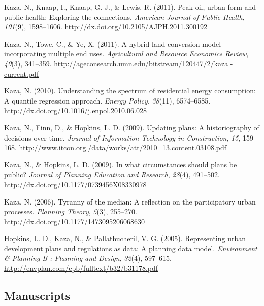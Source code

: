 \documentclass[11pt,a4paper,]{awesome-cv}
\newlength{\cslhangindent}
\newenvironment{CSLReferences}[2] %
 {\begin{list}{}{%
  \setlength{\itemindent}{0pt}
  \setlength{\leftmargin}{0pt}
  \setlength{\parsep}{0pt}
  \ifodd #1
   \setlength{\leftmargin}{\cslhangindent}
   \setlength{\itemindent}{-1\cslhangindent}
  \fi
  \setlength{\itemsep}{#2\baselineskip}}}
 {\end{list}}
\begin{document}
\begin{CSLReferences}{1}{0}
Kaza, N., Knaap, I., Knaap, G. J., \& Lewis, R. (2011). Peak oil, urban
form and public health: Exploring the connections. \emph{American
Journal of Public Health}, \emph{101}(9), 1598--1606.
\url{http://dx.doi.org/10.2105/AJPH.2011.300192}

Kaza, N., Towe, C., \& Ye, X. (2011). A hybrid land conversion model
incorporating multiple end uses. \emph{Agricultural and Resource
Economics Review}, \emph{40}(3), 341--359.
\href{http://ageconsearch.umn.edu/bitstream/120447/2/kaza\%20-\%20current.pdf}{http://ageconsearch.umn.edu/bitstream/120447/2/kaza
- current.pdf}

Kaza, N. (2010). Understanding the spectrum of residential energy
consumption: A quantile regression approach. \emph{Energy Policy},
\emph{38}(11), 6574--6585.
\url{http://dx.doi.org/10.1016/j.enpol.2010.06.028}

Kaza, N., Finn, D., \& Hopkins, L. D. (2009). Updating plans: A
historiography of decisions over time. \emph{Journal of Information
Technology in Construction}, \emph{15}, 159--168.
\url{http://www.itcon.org./data/works/att/2010_13.content.03108.pdf}

Kaza, N., \& Hopkins, L. D. (2009). In what circumstances should plans
be public? \emph{Journal of Planning Education and Research},
\emph{28}(4), 491--502. \url{http://dx.doi.org/10.1177/0739456X08330978}

Kaza, N. (2006). Tyranny of the median: A reflection on the
participatory urban processes. \emph{Planning Theory}, \emph{5}(3),
255--270. \url{http://dx.doi.org/10.1177/1473095206068630}

Hopkins, L. D., Kaza, N., \& Pallathucheril, V. G. (2005). Representing
urban development plans and regulations as data: A planning data model.
\emph{Environment \& Planning B : Planning and Design}, \emph{32}(4),
597--615. \url{http://envplan.com/epb/fulltext/b32/b31178.pdf}

\end{CSLReferences}

\subsection{Manuscripts}\label{manuscripts}
\end{document}

